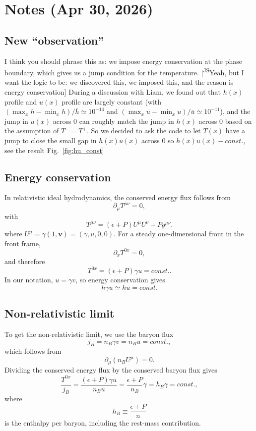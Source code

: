 \documentclass[11pt]{article}
\newcommand{\LB}[1]{{\color{brown}#1}}
\newcommand{\JScom}[1]{\textsf{\color{violet} [\textsuperscript{JS}#1]}}
\begin{document}
\section{Notes (Apr 30, 2026)}

\subsection*{New ``observation''}
\LB{I think you should phrase this as: we impose energy conservation at the phase boundary, which gives us a jump condition for the temperature.}\JScom{Yeah, but I want the logic to be: we discovered this, we imposed this, and the reason is energy conservation} During a discussion with Liam, we found out that $h(x)$ profile and $u(x)$ profile are largely constant (with $(\max_x h - \min_x h)/\bar h\simeq 10^{-14}$ and $(\max_x u - \min_x u)/\bar u\simeq 10^{-11}$), and the jump in $u(x)$ across 0 can roughly match the jump in $h(x)$ across 0 based on the assumption of $T^- = T^+$. So we decided to ask the code to let $T(x)$ have a jump to close the small gap in $h(x)u(x)$ across 0 so $h(x)u(x) - const. $, see the result Fig.~\ref{fig:hu_const}

\subsection*{Energy conservation}

In relativistic ideal hydrodynamics, the conserved energy flux follows from
\[
\partial_\mu T^{\mu\nu}=0,
\]
with
\[
T^{\mu\nu}=(\epsilon+P)U^\mu U^\nu+P g^{\mu\nu}.
\]
where $U^\mu = \gamma (1, \mathbf{v}) = (\gamma, u, 0, 0)$.
For a steady one-dimensional front in the front frame,
\[
\partial_x T^{0x}=0,
\]
and therefore
\[
T^{0x}=(\epsilon+P)\gamma u=const..
\]
In our notation, $u = \gamma v$, so energy conservation gives
\[
\boxed{h\gamma u\simeq hu = const.}
\]

\subsection*{Non-relativistic limit}
To get the non-relativistic limit, we use the baryon flux
\[
j_B=n_B\gamma v = n_Bu =const.,
\]
which follows from
\[
\partial_\mu(n_B U^\mu)=0.
\]
Dividing the conserved energy flux by the conserved baryon flux gives
\[
\frac{T^{0x}}{j_B}
=
\frac{(\epsilon+P)\gamma u}{n_B u}
=
\frac{\epsilon+P}{n_B}\gamma
=
h_B\gamma
=
const.,
\]
where
\[
h_B\equiv\frac{\epsilon+P}{n}
\]
is the enthalpy per baryon, including the rest-mass contribution. 
\end{document}
